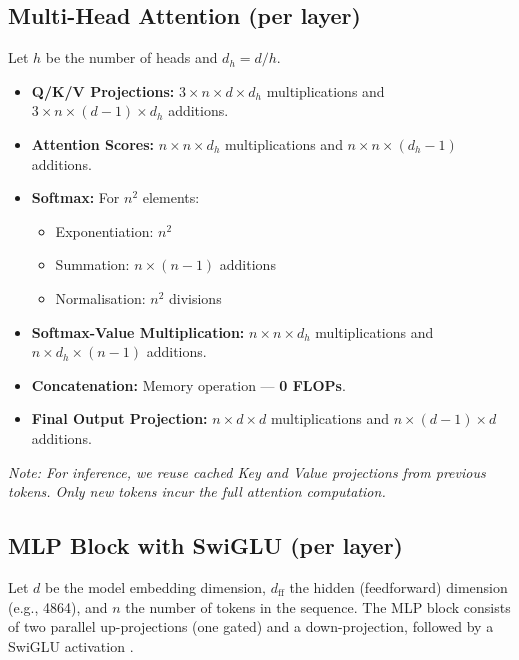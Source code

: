 \documentclass[a4paper,12pt]{article}
\begin{document}
\subsection*{Multi-Head Attention (per layer)}
Let $h$ be the number of heads and $d_h = d / h$.
\begin{itemize}
  \item \textbf{Q/K/V Projections:} $3 \times n \times d \times d_h$ multiplications and $3 \times n \times (d - 1) \times d_h$ additions.
  \item \textbf{Attention Scores:} $n \times n \times d_h$ multiplications and $n \times n \times (d_h - 1)$ additions.
  \item \textbf{Softmax:} For $n^2$ elements:
    \begin{itemize}
      \item Exponentiation: $n^2$
      \item Summation: $n \times (n - 1)$ additions
      \item Normalisation: $n^2$ divisions
    \end{itemize}
  \item \textbf{Softmax-Value Multiplication:} $n \times n \times d_h$ multiplications and $n \times d_h \times (n - 1)$ additions.
  \item \textbf{Concatenation:} Memory operation — \textbf{0 FLOPs}.
  \item \textbf{Final Output Projection:} $n \times d \times d$ multiplications and $n \times (d - 1) \times d$ additions.
\end{itemize}
\textit{Note: For inference, we reuse cached Key and Value projections from previous tokens. Only new tokens incur the full attention computation.}

\subsection*{MLP Block with SwiGLU (per layer)}

Let $d$ be the model embedding dimension, $d_{\text{ff}}$ the hidden (feedforward) dimension (e.g., 4864), and $n$ the number of tokens in the sequence. The MLP block consists of two parallel up-projections (one gated) and a down-projection, followed by a SwiGLU activation \citep{shazeer2020glu}.
\end{document}
